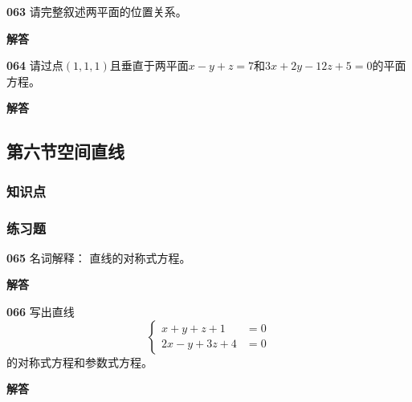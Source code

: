 \documentclass[a4paper,10pt]{article} %
\begin{document}


\textheight

\newpage
\par\noindent \textbf{063} \quad 请完整叙述两平面的位置关系。
\par\noindent \textbf{ 解答}





\textheight


\par\noindent \textbf{064} \quad 请过点$(1,1,1)$且垂直于两平面$x-y+z=7$和$3x+2y-12z+5=0$的平面方程。
\par\noindent \textbf{ 解答}





\textheight


\newpage
\subsection{第六节\quad 空间直线}
\subsubsection{知识点}
\subsubsection{练习题}
\par\noindent \textbf{065} \quad 名词解释： 直线的对称式方程。
\par\noindent \textbf{ 解答}





\textheight


\par\noindent \textbf{066} \quad 写出直线
\begin{equation*}    %
 \begin{cases}
    x+y+z+1 & =0 \\
    2x-y+3z+4 & =0
 \end{cases}                
\end{equation*}
的对称式方程和参数式方程。
\par\noindent \textbf{ 解答}
\end{document}
